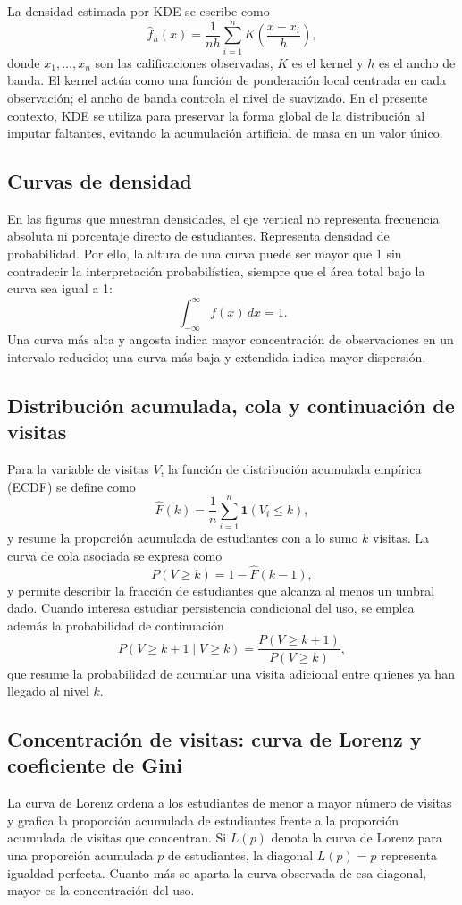 \documentclass[8pt,a4paper]{article} %
\numberwithin{figure}{subsection}
\begin{document}
La densidad estimada por KDE se escribe como
\[
\hat f_h(x)=\frac{1}{nh}\sum_{i=1}^{n}K\!\left(\frac{x-x_i}{h}\right),
\]
donde $x_1,\dots,x_n$ son las calificaciones observadas, $K$ es el kernel y $h$ es el ancho de banda. El kernel actúa como una función de ponderación local centrada en cada observación; el ancho de banda controla el nivel de suavizado. En el presente contexto, KDE se utiliza para preservar la forma global de la distribución al imputar faltantes, evitando la acumulación artificial de masa en un valor único.

\subsection{Curvas de densidad}
En las figuras que muestran densidades, el eje vertical no representa frecuencia absoluta ni porcentaje directo de estudiantes. Representa densidad de probabilidad. Por ello, la altura de una curva puede ser mayor que 1 sin contradecir la interpretación probabilística, siempre que el área total bajo la curva sea igual a 1:
\[
\int_{-\infty}^{\infty} f(x)\,dx = 1.
\]
Una curva más alta y angosta indica mayor concentración de observaciones en un intervalo reducido; una curva más baja y extendida indica mayor dispersión.

\subsection{Distribución acumulada, cola y continuación de visitas}
Para la variable de visitas $V$, la función de distribución acumulada empírica (ECDF) se define como
\[
\hat F(k)=\frac{1}{n}\sum_{i=1}^{n}\mathbf{1}(V_i\leq k),
\]
y resume la proporción acumulada de estudiantes con a lo sumo $k$ visitas. La curva de cola asociada se expresa como
\[
P(V\geq k)=1-\hat F(k-1),
\]
y permite describir la fracción de estudiantes que alcanza al menos un umbral dado. Cuando interesa estudiar persistencia condicional del uso, se emplea además la probabilidad de continuación
\[
P(V\geq k+1 \mid V\geq k)=\frac{P(V\geq k+1)}{P(V\geq k)},
\]
que resume la probabilidad de acumular una visita adicional entre quienes ya han llegado al nivel $k$.

\subsection{Concentración de visitas: curva de Lorenz y coeficiente de Gini}
La curva de Lorenz ordena a los estudiantes de menor a mayor número de visitas y grafica la proporción acumulada de estudiantes frente a la proporción acumulada de visitas que concentran. Si $L(p)$ denota la curva de Lorenz para una proporción acumulada $p$ de estudiantes, la diagonal $L(p)=p$ representa igualdad perfecta. Cuanto más se aparta la curva observada de esa diagonal, mayor es la concentración del uso.
\end{document}
